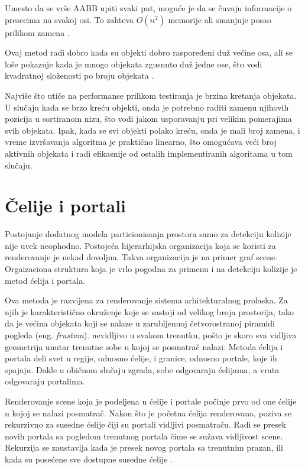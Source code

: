 \documentclass[12pt,oneside]{memoir}
\begin{document}
Umesto da se vrše AABB upiti svaki put, moguće je da se čuvaju informacije o presecima 
na svakoj osi. To zahteva $O(n^2)$ memorije ali smanjuje posao prilikom zamena \cite{sap}. 

Ovaj metod radi dobro kada su objekti dobro raspoređeni duž većine osa, ali se loše pokazuje kada je
mnogo objekata zgusnuto duž jedne ose, što vodi kvadratnoj složenosti po broju objekata \cite{glavna2}.

Najviše što utiče na performanse prilikom testiranja je brzina kretanja objekata. 
U slučaju kada se brzo kreću objekti, onda je potrebno raditi zamenu njihovih pozicija u sortiranom nizu,
što vodi jakom usporavanju pri velikim pomerajima svih objekata. 
Ipak, kada se svi objekti polako kreću, onda je mali broj zamena, i vreme izvršavanja algoritma je praktično 
linearno, što omogućava veći broj aktivnih objekata i radi efikasnije od ostalih implementiranih algoritama u tom slučaju.

\section{Čelije i portali}
\label{subsec:cells}

Postojanje dodatnog modela particionisanja prostora samo za detekciju kolizije nije uvek neophodno.
Postojeća hijerarhijska organizacija koja se koristi za renderovanje je nekad dovoljna.
Takva organizacija je na primer graf scene. Orgaizaciona struktura koja je vrlo pogodna
za primenu i na detekciju kolizije je metod ćelija i portala.

Ova metoda je razvijena za renderovanje sistema arhitekturalnog prolaska. 
Za njih je karakteristično okruženje koje se sastoji od velikog broja prostorija, tako da je 
većina objekata koji se nalaze u zarubljenuoj četvorostranoj piramidi pogleda (eng. {\em frustum}).
nevidljivo u svakom trenutku, pošto je skoro sva vidljiva geometrija unutar trenutne sobe
u kojoj se posmatrač nalazi.
Metoda ćelija i portala deli svet u regije, odnosno ćelije, i granice, odnosno portale, koje 
ih spajaju. Dakle u običnom slučaju zgrada, sobe odgovaraju ćelijama, a vrata odgovaraju
portalima. 

Renderovanje scene koja je podeljena u ćelije i portale počinje prvo od one ćelije u 
kojoj se nalazi posmatrač. Nakon što je početna ćelija renderovana, poziva se rekurzivno
za susedne ćelije čiji su portali vidljivi posmatraču. Radi se presek novih portala
sa pogledom trenutnog portala čime se sužava vidljivost scene. Rekurzija se zaustavlja 
kada je presek novog portala sa trenutnim prazan, ili kada su posećene sve dostupne susedne ćelije \cite{glavnaKnjiga}.
\end{document}
